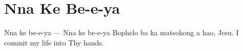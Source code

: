 \starttocol
\chapter{Nna Ke Be-e-ya}
\nexttocol
\hfill{\it }
\stoptocol
\starttocol
\startlines
{\sc Nna} ke be-e-ya ---  Nna ke be-e-ya 
Bophelo ba ka matsohong a hao,  Jesu.
\stoplines
\nexttocol
I commit my life into Thy hands.
\stoptocol

